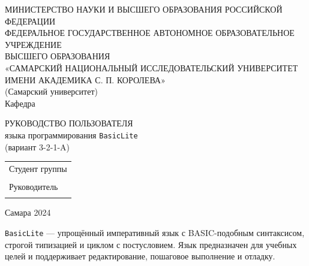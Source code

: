 \documentclass[14pt,a4paper]{article}
\begin{document}
\begin{titlepage}
\begin{center}
МИНИСТЕРСТВО НАУКИ И ВЫСШЕГО ОБРАЗОВАНИЯ РОССИЙСКОЙ ФЕДЕРАЦИИ\\
ФЕДЕРАЛЬНОЕ ГОСУДАРСТВЕННОЕ АВТОНОМНОЕ ОБРАЗОВАТЕЛЬНОЕ УЧРЕЖДЕНИЕ\\
ВЫСШЕГО ОБРАЗОВАНИЯ\\
«САМАРСКИЙ НАЦИОНАЛЬНЫЙ ИССЛЕДОВАТЕЛЬСКИЙ УНИВЕРСИТЕТ\\
ИМЕНИ АКАДЕМИКА С. П. КОРОЛЕВА»\\
(Самарский университет)\\[12pt]
Кафедра \underline{\hspace{6cm}}
\end{center}

\vfill

\begin{center}
РУКОВОДСТВО ПОЛЬЗОВАТЕЛЯ\\
языка программирования \texttt{BasicLite}\\
(вариант 3-2-1-A)
\end{center}

\vfill

\begin{flushright}
\begin{tabular}{l}
Студент группы \underline{\hspace{2.5cm}} \\
\underline{\hspace{5cm}} \\
Руководитель \underline{\hspace{2.5cm}} \\
\underline{\hspace{5cm}}
\end{tabular}
\end{flushright}

\vfill

\begin{center}
Самара 2024
\end{center}
\end{titlepage}

\tableofcontents


\texttt{BasicLite} — упрощённый императивный язык с BASIC-подобным
синтаксисом, строгой типизацией и циклом с постусловием. Язык
предназначен для учебных целей и поддерживает редактирование,
пошаговое выполнение и отладку.
\end{document}
